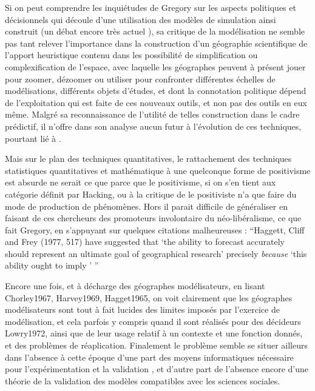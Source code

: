 Si on peut comprendre les inquiétudes de Gregory \textcite{Gregory1978} sur les aspects politiques et décisionnels qui découle d'une utilisation des modèles de simulation ainsi construit (un débat encore très actuel \autocite{OSullivan2004} ), sa critique de la modélisation ne semble pas tant relever l'importance dans la construction d'un géographie scientifique de l'apport heuristique contenu dans les possibilité de simplification ou complexification de l'espace, avec laquelle les géographes peuvent à présent jouer pour zoomer, dézoomer ou utiliser pour confronter différentes échelles de modélisations, différents objets d'études, et dont la connotation politique dépend de l'exploitation qui est faite de ces nouveaux outils, et non pas des outils en eux même. Malgré sa reconnaissance de l'utilité de telles construction dans le cadre prédictif, il n'offre dans son analyse aucun futur à l'évolution de ces techniques, pourtant lié à .

Mais sur le plan des techniques quantitatives, le rattachement des techniques statistiques quantitatives et mathématique à une quelconque forme de positivisme est absurde ne serait ce que parce que le positivisme, si on s'en tient aux catégorie définit par Hacking, ou à la critique de \autocite{Dauphine2003} le positiviste n'a que faire du mode de production de phénomènes. Hors il parait difficile de généraliser en faisant de ces chercheurs des promoteurs involontaire du néo-libéralisme, ce que fait Gregory, en s'appuyant sur quelques citations malheureuses : \foreignquote{english}{Haggett, Cliff and Frey (1977, 517) have suggested that \foreignquote{english}{the ability to forecast accurately should represent an ultimate goal of geographical research} precisely \textit{because} \foreignquote{english}{this ability ought to imply } } \autocite{Gregory1978} 

Encore une fois, et à décharge des géographes modélisateurs, en lisant Chorley1967, Harvey1969, Hagget1965, on voit clairement que les géographes modélisateurs sont tout à fait lucides des limites imposés par l'exercice de modélisation, et cela parfois y compris quand il sont réalisés pour des décideurs Lowry1972, ainsi que de leur usage relatif à un contexte et une fonction donnés, et des problèmes de réaplication. Finalement le problème semble se situer ailleurs dans l'absence à cette époque d'une part des moyens informatiques nécessaire pour l'expérimentation et la validation \autocite{Hagget1969, Marble1972}, et d'autre part de l'absence encore d'une théorie de la validation des modèles compatibles avec les sciences sociales.

